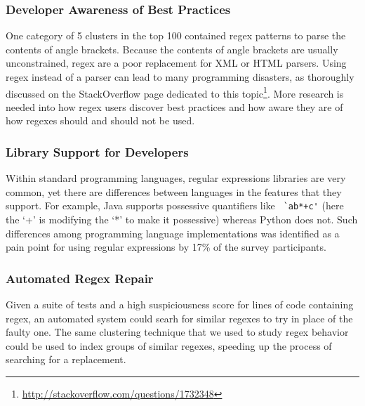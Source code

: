\subsubsection{Developer Awareness of Best Practices}
One category of 5 clusters in the top 100 contained regex patterns to parse the contents of angle brackets.  Because the contents of angle brackets are usually unconstrained, regex are a poor replacement for XML or HTML parsers.  Using regex instead of a parser can lead to many programming disasters, as thoroughly discussed on the StackOverflow page dedicated to this topic\footnote{\url{http://stackoverflow.com/questions/1732348}}.  More research is needed into how regex users discover best practices and how aware they are of how regexes should and should not be used.

\subsubsection{Library Support for Developers}
Within standard programming languages, regular expressions libraries are very common, yet there are  differences between languages in the features that they support. For example, Java supports possessive quantifiers like \verb! `ab*+c'! (here the `+' is modifying the `*' to make it possessive) whereas Python does not. Such differences among programming language implementations was identified as a pain point for using regular expressions by 17\% of the survey participants.  


\subsubsection{Automated Regex Repair}
Given a suite of tests and a high suspiciousness score for lines of code containing regex, an automated system could searh for similar regexes to try in place of the faulty one.  The same clustering technique that we used to study regex behavior could be used to index groups of similar regexes, speeding up the process of searching for a replacement.

